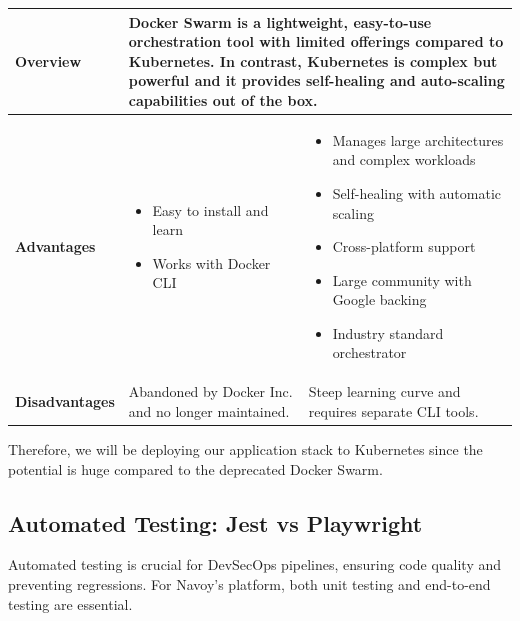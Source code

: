 \begin{longtable}{| p{} | p{} | p{} |}
    \hline
    \endlastfoot

    \textbf{Overview}                  & \multicolumn{2}{p{0.76\textwidth}|}{Docker Swarm is a lightweight, easy-to-use orchestration tool with limited offerings compared to Kubernetes. In contrast, Kubernetes is complex but powerful and it provides self-healing and auto-scaling capabilities out of the box.}                                                         \\
    \hline
    \textbf{Advantages}                & \begin{itemize}[leftmargin=*, topsep=0pt, itemsep=1pt, parsep=2pt]
        \item Easy to install and learn
        \item Works with Docker CLI
    \end{itemize}                                                                                                                                                                                                                                                & \begin{itemize}[leftmargin=*, topsep=0pt, itemsep=1pt, parsep=2pt]
        \item Manages large architectures and complex workloads
        \item Self-healing with automatic scaling
        \item Cross-platform support
        \item Large community with Google backing
        \item Industry standard orchestrator
    \end{itemize}                        \\
    \hline
    \textbf{Disadvantages}             & Abandoned by Docker Inc. and no longer maintained.                                                                                                                                                                                                                           & Steep learning curve and requires separate CLI tools. \\
    \hline
\end{longtable}
Therefore, we will be deploying our application stack to Kubernetes since the potential is huge compared to the deprecated Docker Swarm.

\subsection{Automated Testing: Jest vs Playwright}
Automated testing is crucial for DevSecOps pipelines, ensuring code quality and preventing regressions. For Navoy's platform, both unit testing and end-to-end testing are essential.

